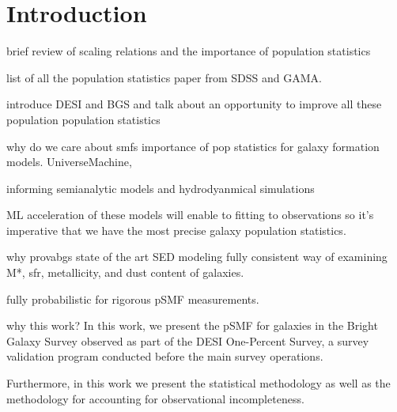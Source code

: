 \section{Introduction} \label{sec:intro} 
brief review of scaling relations and the importance of population statistics  

list of all the population statistics paper from SDSS and GAMA. 

introduce DESI and BGS and talk about an opportunity to improve all these
population population statistics 

{\color{red} why do we care about smfs} 
importance of pop statistics for galaxy formation models. 
UniverseMachine,

informing semianalytic models and hydrodyanmical simulations

ML acceleration of these models will enable to fitting to observations so it's
imperative that we have the most precise galaxy population statistics. 

{\color{red} why provabgs} 
state of the art SED modeling 
fully consistent way of examining M*, sfr, metallicity, and dust content of
galaxies. 

fully probabilistic for rigorous pSMF measurements. 

{\color{red} why this work?} 
In this work, we present the pSMF for galaxies in the Bright Galaxy Survey
observed as part of the DESI One-Percent Survey, a survey validation program
conducted before the main survey operations. 

Furthermore, in this work we present the statistical methodology as well as the
methodology for accounting for observational incompleteness. 
